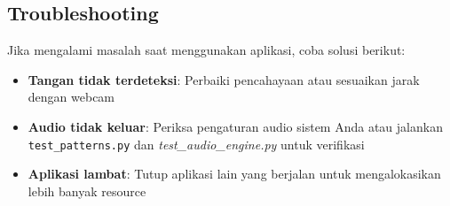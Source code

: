 \subsection{Troubleshooting}

Jika mengalami masalah saat menggunakan aplikasi, coba solusi berikut:

\begin{itemize}
    \item \textbf{Tangan tidak terdeteksi}: Perbaiki pencahayaan atau sesuaikan jarak dengan webcam
    \item \textbf{Audio tidak keluar}: Periksa pengaturan audio sistem Anda atau jalankan \texttt{test\_patterns.py} dan \textit{test\_audio\_engine.py} untuk verifikasi
    \item \textbf{Aplikasi lambat}: Tutup aplikasi lain yang berjalan untuk mengalokasikan lebih banyak resource
\end{itemize}
